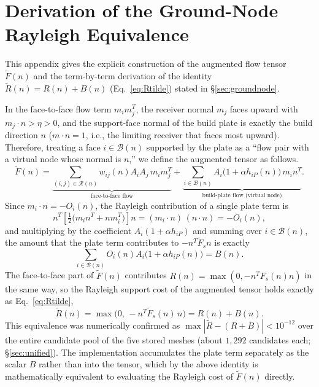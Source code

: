 \documentclass[11pt,a4paper]{article}
\begin{document}
\section{Derivation of the Ground-Node Rayleigh Equivalence}
\label{sec:appendix-proof}

This appendix gives the explicit construction of the augmented flow tensor $\tilde F(n)$ and the term-by-term
derivation of the identity $\tilde R(n)=R(n)+B(n)$ (Eq.~\eqref{eq:Rtilde}) stated in \S\ref{sec:groundnode}.

In the face-to-face flow term $m_im_j^T$, the receiver normal $m_j$ faces upward with $m_j\cdot n>\eta>0$,
and the support-face normal of the build plate is exactly the build direction $n$
($m\cdot n=1$, i.e., the limiting receiver that faces most upward).
Therefore, treating a face $i\in\mathcal{B}(n)$ supported by the plate as a ``flow pair with a virtual node whose normal is $n$,''
we define the augmented tensor as follows.
\begin{equation}
\tilde F(n)
=
\underbrace{\sum_{(i,j)\in\mathcal{R}(n)} w_{ij}(n)A_iA_j\,m_im_j^T}_{\text{face-to-face flow}}
+
\underbrace{\sum_{i\in\mathcal{B}(n)} A_i\big(1+\alpha h_{iP}(n)\big)\,m_in^T}_{\text{build-plate flow (virtual node)}}.
\label{eq:Ftilde}
\end{equation}
Since $m_i\cdot n=-O_i(n)$, the Rayleigh contribution of a single plate term is
\begin{equation}
n^T\!\left[\tfrac{1}{2}\big(m_in^T+nm_i^T\big)\right]\!n
= (m_i\cdot n)\,(n\cdot n) = -O_i(n),
\end{equation}
and multiplying by the coefficient $A_i(1+\alpha h_{iP})$ and summing over $i\in\mathcal{B}(n)$,
the amount that the plate term contributes to $-n^T\tilde F_s n$ is exactly
\begin{equation}
\sum_{i\in\mathcal{B}(n)} O_i(n)A_i\big(1+\alpha h_{iP}(n)\big) = B(n).
\end{equation}
The face-to-face part of $\tilde F(n)$ contributes $R(n)=\max(0,-n^TF_s(n)n)$ in the same way,
so the Rayleigh support cost of the augmented tensor holds exactly as Eq.~\eqref{eq:Rtilde},
\begin{equation*}
\tilde R(n)
=
\max\!\big(0,\,-n^T\tilde F_s(n)\,n\big)
=
R(n)+B(n).
\end{equation*}
This equivalence was numerically confirmed as $\max|\tilde R-(R+B)|<10^{-12}$ over the entire candidate pool
of the five stored meshes (about $1{,}292$ candidates each; \S\ref{sec:unified}).
The implementation accumulates the plate term separately as the scalar $B$ rather than into the tensor,
which by the above identity is mathematically equivalent to evaluating the Rayleigh cost of $\tilde F(n)$ directly.
\end{document}
